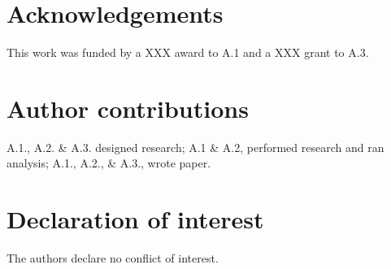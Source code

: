 \section*{Acknowledgements}
This work was funded by a XXX award to A.1 and a XXX grant to A.3. 

\section*{Author contributions}
A.1., A.2. \& A.3. designed research; A.1 \& A.2, performed research and ran analysis; A.1., A.2., \& A.3., wrote paper.

\section*{Declaration of interest}
The authors declare no conflict of interest.
